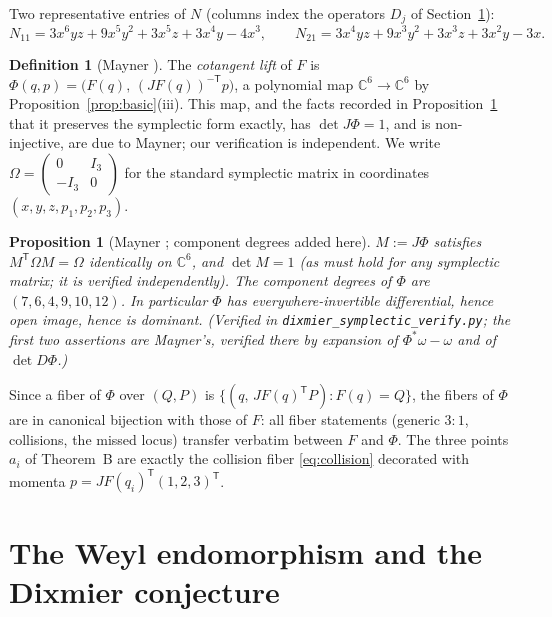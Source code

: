 \documentclass[11pt]{amsart}
\newcommand{\CC}{\mathbb{C}}
\theoremstyle{plain}
\newtheorem{proposition}[theorem]{Proposition}
\theoremstyle{definition}
\newtheorem{definition}[theorem]{Definition}
\theoremstyle{remark}
\begin{document}
Two representative entries of $N$ (columns index the operators $D_{j}$ of
Section~\ref{sec:weyl}):
\[
N_{11}=3x^{6}yz+9x^{5}y^{2}+3x^{5}z+3x^{4}y-4x^{3},\qquad
N_{21}=3x^{4}yz+9x^{3}y^{2}+3x^{3}z+3x^{2}y-3x .
\]

\begin{definition}[Mayner ]\label{def:phi}
The \emph{cotangent lift} of $F$ is
$\Phi(q,p)=\bigl(F(q),\,(JF(q))^{-\mathsf T}p\bigr)$, a polynomial map
$\CC^{6}\to\CC^{6}$ by Proposition~\ref{prop:basic}(iii). This map, and the
facts recorded in Proposition~\ref{prop:phibasic} that it preserves the
symplectic form exactly, has $\det J\Phi=1$, and is non-injective, are due
to Mayner; our verification is independent. We write
$\Omega=\left(\begin{smallmatrix}0&I_{3}\\-I_{3}&0\end{smallmatrix}\right)$
for the standard symplectic matrix in coordinates
$(x,y,z,p_{1},p_{2},p_{3})$.
\end{definition}

\begin{proposition}[Mayner ; component
degrees added here]\label{prop:phibasic}
$M:=J\Phi$ satisfies $M^{\mathsf T}\Omega M=\Omega$ identically on
$\CC^{6}$, and $\det M=1$ (as must hold for any symplectic matrix; it is
verified independently). The component degrees of $\Phi$ are
$(7,6,4,9,10,12)$. In particular $\Phi$ has everywhere-invertible
differential, hence open image, hence is dominant.
\emph{(Verified in \texttt{dixmier\_symplectic\_verify.py}; the first two
assertions are Mayner's, verified there by expansion of
$\Phi^{*}\omega-\omega$ and of $\det D\Phi$.)}
\end{proposition}

Since a fiber of $\Phi$ over $(Q,P)$ is
$\{(q,\,JF(q)^{\mathsf T}P):F(q)=Q\}$, the fibers of $\Phi$ are in
canonical bijection with those of $F$: all fiber statements (generic
$3{:}1$, collisions, the missed locus) transfer verbatim between $F$ and
$\Phi$. The three points $a_{i}$ of Theorem~B are exactly the collision
fiber \eqref{eq:collision} decorated with momenta
$p=JF(q_{i})^{\mathsf T}(1,2,3)^{\mathsf T}$.

\section{The Weyl endomorphism and the Dixmier conjecture}
\label{sec:weyl}
\end{document}
